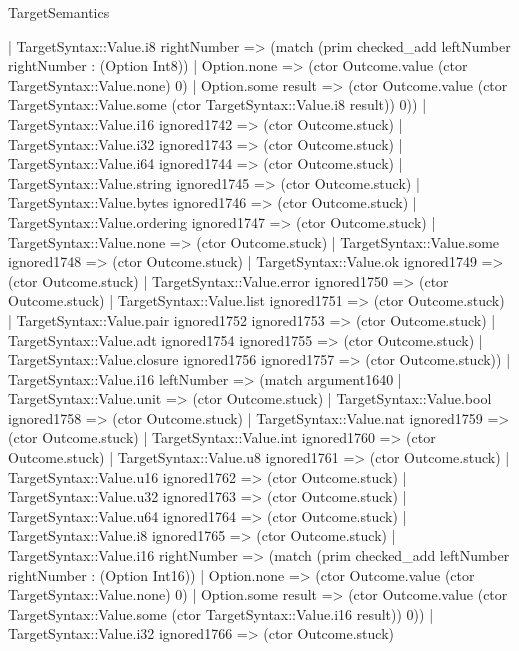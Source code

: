 \begin{lexlean}{TargetSemantics}
\begin{semanticmodule}
{              | TargetSyntax::Value.i8 rightNumber => (match (prim checked_add leftNumber rightNumber : (Option Int8))
                | Option.none => (ctor Outcome.value (ctor TargetSyntax::Value.none) 0)
                | Option.some result => (ctor Outcome.value (ctor TargetSyntax::Value.some (ctor TargetSyntax::Value.i8 result)) 0))
              | TargetSyntax::Value.i16 ignored1742 => (ctor Outcome.stuck)
              | TargetSyntax::Value.i32 ignored1743 => (ctor Outcome.stuck)
              | TargetSyntax::Value.i64 ignored1744 => (ctor Outcome.stuck)
              | TargetSyntax::Value.string ignored1745 => (ctor Outcome.stuck)
              | TargetSyntax::Value.bytes ignored1746 => (ctor Outcome.stuck)
              | TargetSyntax::Value.ordering ignored1747 => (ctor Outcome.stuck)
              | TargetSyntax::Value.none => (ctor Outcome.stuck)
              | TargetSyntax::Value.some ignored1748 => (ctor Outcome.stuck)
              | TargetSyntax::Value.ok ignored1749 => (ctor Outcome.stuck)
              | TargetSyntax::Value.error ignored1750 => (ctor Outcome.stuck)
              | TargetSyntax::Value.list ignored1751 => (ctor Outcome.stuck)
              | TargetSyntax::Value.pair ignored1752 ignored1753 => (ctor Outcome.stuck)
              | TargetSyntax::Value.adt ignored1754 ignored1755 => (ctor Outcome.stuck)
              | TargetSyntax::Value.closure ignored1756 ignored1757 => (ctor Outcome.stuck))
            | TargetSyntax::Value.i16 leftNumber => (match argument1640
              | TargetSyntax::Value.unit => (ctor Outcome.stuck)
              | TargetSyntax::Value.bool ignored1758 => (ctor Outcome.stuck)
              | TargetSyntax::Value.nat ignored1759 => (ctor Outcome.stuck)
              | TargetSyntax::Value.int ignored1760 => (ctor Outcome.stuck)
              | TargetSyntax::Value.u8 ignored1761 => (ctor Outcome.stuck)
              | TargetSyntax::Value.u16 ignored1762 => (ctor Outcome.stuck)
              | TargetSyntax::Value.u32 ignored1763 => (ctor Outcome.stuck)
              | TargetSyntax::Value.u64 ignored1764 => (ctor Outcome.stuck)
              | TargetSyntax::Value.i8 ignored1765 => (ctor Outcome.stuck)
              | TargetSyntax::Value.i16 rightNumber => (match (prim checked_add leftNumber rightNumber : (Option Int16))
                | Option.none => (ctor Outcome.value (ctor TargetSyntax::Value.none) 0)
                | Option.some result => (ctor Outcome.value (ctor TargetSyntax::Value.some (ctor TargetSyntax::Value.i16 result)) 0))
              | TargetSyntax::Value.i32 ignored1766 => (ctor Outcome.stuck)
}
\end{semanticmodule}
\end{lexlean}

